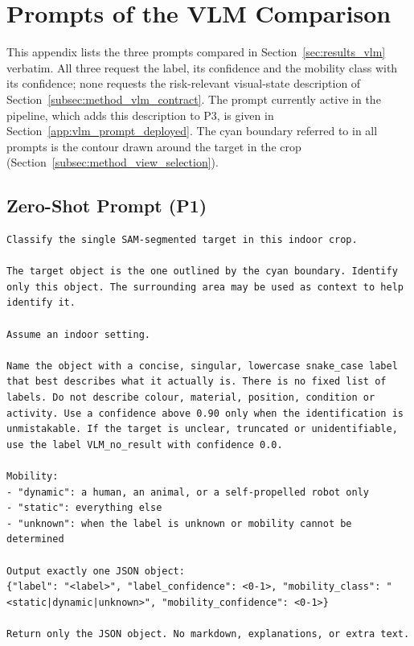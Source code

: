 \chapter{Prompts of the VLM Comparison}
\label{app:vlm_prompts}


{\small This appendix lists the three prompts compared in Section~\ref{sec:results_vlm} verbatim. All three request the label, its confidence and the mobility class with its confidence; none requests the risk-relevant visual-state description of Section~\ref{subsec:method_vlm_contract}. The prompt currently active in the pipeline, which adds this description to P3, is given in Section~\ref{app:vlm_prompt_deployed}. The cyan boundary referred to in all prompts is the contour drawn around the target in the crop (Section~\ref{subsec:method_view_selection}).\par}

\section{Zero-Shot Prompt (P1)}
\label{app:vlm_prompt_p1}
\begin{lstlisting}[style=promptstyle]
Classify the single SAM-segmented target in this indoor crop.

The target object is the one outlined by the cyan boundary. Identify only this object. The surrounding area may be used as context to help identify it.

Assume an indoor setting.

Name the object with a concise, singular, lowercase snake_case label that best describes what it actually is. There is no fixed list of labels. Do not describe colour, material, position, condition or activity. Use a confidence above 0.90 only when the identification is unmistakable. If the target is unclear, truncated or unidentifiable, use the label VLM_no_result with confidence 0.0.

Mobility:
- "dynamic": a human, an animal, or a self-propelled robot only
- "static": everything else
- "unknown": when the label is unknown or mobility cannot be determined

Output exactly one JSON object:
{"label": "<label>", "label_confidence": <0-1>, "mobility_class": "<static|dynamic|unknown>", "mobility_confidence": <0-1>}

Return only the JSON object. No markdown, explanations, or extra text.
\end{lstlisting}

